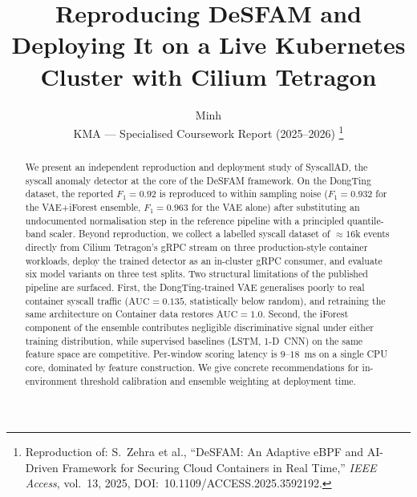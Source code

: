 \documentclass[journal,10pt,twoside]{IEEEtran}
\begin{document}
\title{Reproducing DeSFAM and Deploying It on a Live Kubernetes Cluster with Cilium Tetragon}

\author{Minh \\ KMA --- Specialised Coursework Report (2025--2026)
\thanks{Reproduction of: S.~Zehra et al.,
``DeSFAM: An Adaptive eBPF and AI-Driven Framework for Securing Cloud
Containers in Real Time,'' \textit{IEEE Access}, vol.~13, 2025,
DOI:~10.1109/ACCESS.2025.3592192.}}

\maketitle

\begin{abstract}
We present an independent reproduction and deployment study of
SyscallAD, the syscall anomaly detector at the core of the DeSFAM
framework. On the DongTing dataset, the reported $F_{1}=0.92$ is
reproduced to within sampling noise ($F_{1}=0.932$ for the
VAE+iForest ensemble, $F_{1}=0.963$ for the VAE alone) after
substituting an undocumented normalisation step in the reference
pipeline with a principled quantile-band scaler. Beyond reproduction,
we collect a labelled syscall dataset of $\approx\!16$k events
directly from Cilium Tetragon's gRPC stream on three production-style
container workloads, deploy the trained detector as an in-cluster
gRPC consumer, and evaluate six model variants on three test splits.
Two structural limitations of the published pipeline are surfaced.
First, the DongTing-trained VAE generalises poorly to real container
syscall traffic ($\text{AUC}=0.135$, statistically below random), and
retraining the same architecture on Container data restores
$\text{AUC}=1.0$. Second, the iForest component of the ensemble
contributes negligible discriminative signal under either training
distribution, while supervised baselines (LSTM, 1-D~CNN) on the same
feature space are competitive. Per-window scoring latency is
$9$--$18$~ms on a single CPU core, dominated by feature construction.
We give concrete recommendations for in-environment threshold
calibration and ensemble weighting at deployment time.
\end{abstract}





\end{document}
